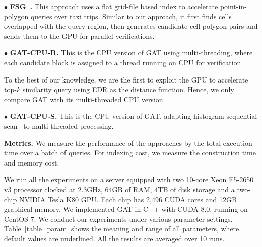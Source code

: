 \documentclass[10pt,conference,letterpaper]{IEEEtran}
\newcommand{\frname}{GAT\xspace }
\begin{document}
\vspace{0.1cm}$\bullet$ \textbf{FSG~\cite{GPUTaxi}.} This approach uses a flat grid-file based index to accelerate point-in-polygon queries over taxi trips. Similar to our approach, it first finds cells overlapped with the query region, then generates candidate cell-polygon pairs and sends them to the GPU for parallel verifications.

\vspace{0.1cm}$\bullet$ \textbf{\frname-CPU-R.} This is the CPU version of \frname using multi-threading, where each candidate block is assigned to a thread running on CPU for verification.

To the best of our knowledge, we are the first to exploit the GPU to accelerate top-$k$ similarity query using EDR as the distance function. Hence, we only compare \frname with its multi-threaded CPU version.

\vspace{0.1cm}$\bullet$ \textbf{\frname-CPU-S.} This is the CPU version of \frname, adapting histogram sequential scan~\cite{DBLP:conf/sigmod/ChenOO05} to multi-threaded processing.

\vspace{0.1cm}\textbf{Metrics.}
We measure the performance of the approaches by the total execution time over a batch of queries. For indexing cost, we measure the construction time and memory cost.

We run all the experiments on a server equipped with two 10-core Xeon E5-2650 v3 processor clocked at 2.3GHz, 64GB of RAM, 4TB of disk storage and a two-chip NVIDIA Tesla K80 GPU. Each chip has 2,496 CUDA cores and 12GB graphical memory. We implemented \frname in C++ with CUDA 8.0, running on CentOS 7. We conduct our experiments under various parameter settings. Table~\ref{table_param} shows the meaning and range of all parameters, where default values are underlined. All the results are averaged over 10 runs.

\end{document}
